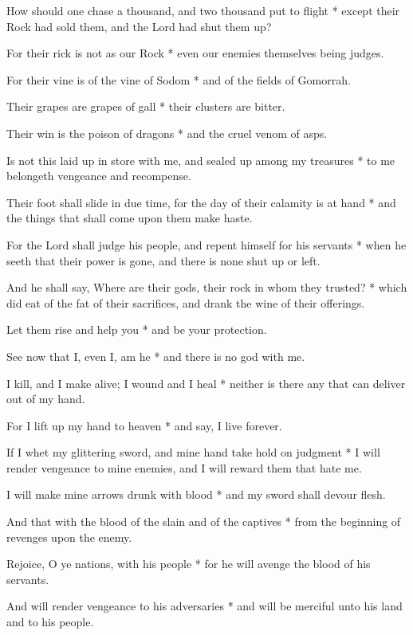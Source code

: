 How should one chase a thousand, and two thousand put to flight * except their Rock had sold them, and the Lord had shut them up?

For their rick is not as our Rock * even our enemies themselves being judges.

For their vine is of the vine of Sodom * and of the fields of Gomorrah.

Their grapes are grapes of gall * their clusters are bitter.

Their win is the poison of dragons * and the cruel venom of asps.

Is not this laid up in store with me, and sealed up among my treasures *  to me belongeth vengeance and recompense.

Their foot shall slide in due time, for the day of their calamity is at hand * and the things that shall come upon them make haste.

For the Lord shall judge his people, and repent himself for his servants * when he seeth that their power is gone, and there is none shut up or left.

And he shall say, Where are their gods, their rock in whom they trusted? * which did eat of the fat of their sacrifices, and drank the wine of their offerings.

Let them rise and help you * and be your protection.

See now that I, even I, am he * and there is no god with me.

I kill, and I make alive; I wound and I heal * neither is there any that can deliver out of my hand.

For I lift up my hand to heaven * and say, I live forever.

If I whet my glittering sword, and mine hand take hold on judgment * I will render vengeance to mine enemies, and I will reward them that hate me.

I will make mine arrows drunk with blood * and my sword shall devour flesh.

And that with the blood of the slain and of the captives * from the beginning of revenges upon the enemy.

Rejoice, O ye nations, with his people * for he will avenge the blood of his servants.

And will render vengeance to his adversaries * and will be merciful unto his land and to his people.
